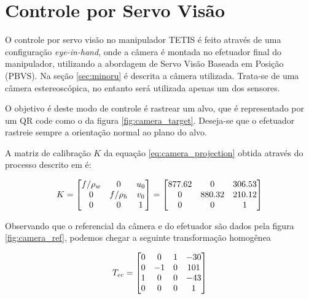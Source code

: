 \section{Controle por Servo Visão} \label{sec:servo_vision}
O controle por servo visão no manipulador TETIS é feito através de uma configuração \textit{eye-in-hand}, onde a câmera é montada no efetuador final do manipulador, utilizando a abordagem de Servo Visão Baseada em Posição (PBVS). Na seção \ref{sec:minoru} é descrita a câmera utilizada. Trata-se de uma câmera estereoscópica, no entanto será utilizada apenas um dos sensores.



O objetivo é deste modo de controle é rastrear um alvo, que é representado por um QR code como o da figura \ref{fig:camera_target}. Deseja-se que o efetuador rastreie sempre a orientação normal ao plano do alvo.

A matriz de calibração ${K}$ da equação \eqref{eq:camera_projection} obtida através do processo descrito em \cite{calibration_tutorial} é:

\begin{equation}
{K} = \begin{bmatrix}
	f/\rho_w & 0 & u_0 \\
	0        & f/\rho_h &v_0 \\
	0 & 0 & 1 \\
\end{bmatrix}
=
\begin{bmatrix}
	877.62 	& 0 		& 306.53 \\
	0  		& 880.32 	& 210.12 \\
	0   	& 0 		& 1 \\	
\end{bmatrix}	
\end{equation}

Observando que o referencial da câmera e do efetuador são dados pela figura \ref{fig:camera_ref}, podemos chegar a seguinte transformação homogênea

\begin{equation} \label{eq:tec}
{T}_{ec} = \begin{bmatrix}
	0 & 0 & 1 & -30 \\
	0 & -1 & 0 & 101 \\
	1 &  0 & 0 & -43 \\
	0 &  0 & 0 &  1
\end{bmatrix}
\end{equation}

